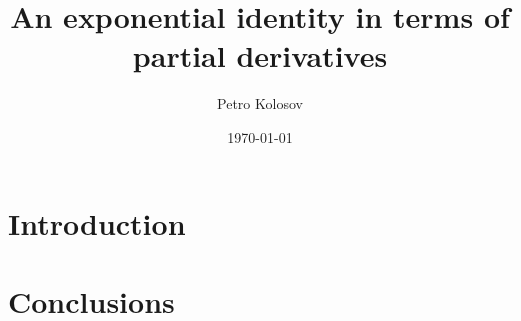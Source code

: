 \documentclass[12pt,letterpaper,oneside,reqno]{amsart}
\title[An exponential identity in terms of partial derivatives]
{An exponential identity in terms of partial derivatives}
\author[Petro Kolosov]{Petro Kolosov}
\date{\today}
\begin{document}
    \begin{abstract}
        
    \end{abstract}

    \maketitle

    \tableofcontents


    \section{Introduction} \label{sec:introduction}
    


    \section{Conclusions}\label{sec:conclusions}
    

    
    
\end{document}

